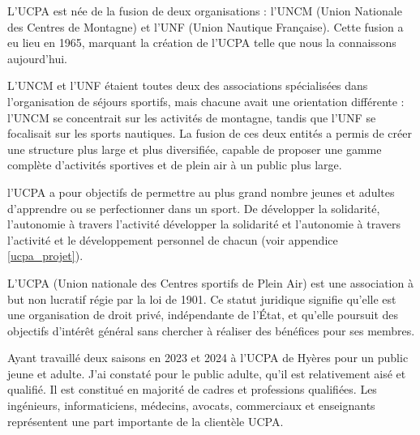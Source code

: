 \documentclass[12pt,a4paper]{report}
\begin{document}

L'UCPA est  née de la fusion de deux organisations : l'UNCM 
(Union Nationale des Centres de Montagne)
et l'UNF (Union Nautique Française). Cette fusion a eu lieu en
1965, marquant la création de l'UCPA telle que nous la connaissons aujourd'hui.

L'UNCM et l'UNF étaient toutes deux des associations spécialisées
dans l'organisation de  séjours sportifs, mais chacune avait une
orientation différente : l'UNCM se concentrait sur les activités 
de montagne, tandis que l'UNF se focalisait sur les sports nautiques. 
La fusion de ces deux entités a permis de créer une structure plus 
large et plus diversifiée, capable de proposer une gamme complète 
d'activités sportives et de plein air à un public plus large.


l'UCPA a pour objectifs de permettre au plus grand nombre jeunes et adultes
d'apprendre ou se perfectionner dans un sport. De développer la solidarité,
l'autonomie à travers l'activité développer la solidarité et l'autonomie
à travers l'activité et le développement personnel de chacun 
(voir appendice \ref{ucpa_projet}).


L'UCPA (Union nationale des Centres sportifs de Plein Air) est une association
à but non lucratif régie par la loi de 1901. Ce statut juridique signifie qu'elle est une
organisation de droit privé, indépendante de l'État, et qu'elle poursuit des 
objectifs d'intérêt général sans chercher à réaliser des bénéfices pour ses membres.

Ayant travaillé  deux saisons en 2023 et 2024 à l'UCPA de Hyères pour 
un public jeune et adulte. J'ai  constaté pour le public 
adulte, qu'il est relativement aisé et qualifié. Il est
constitué en majorité de cadres et professions qualifiées. Les
ingénieurs, informaticiens, médecins, avocats, commerciaux et enseignants
représentent une part importante de la clientèle UCPA.
\end{document}
